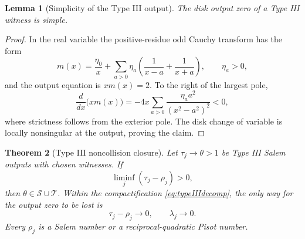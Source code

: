 \documentclass[11pt,reqno]{amsart}
\newtheorem{theorem}{Theorem}[section]
\newtheorem{lemma}[theorem]{Lemma}
\theoremstyle{definition}
\theoremstyle{remark}
\newcommand{\calS}{\mathcal S}
\newcommand{\calT}{\mathcal T}
\begin{document}
\begin{lemma}[Simplicity of the Type III output]\label{lem:IIIsimple}
The disk output zero of a Type III witness is simple.
\end{lemma}

\begin{proof}
In the real variable the positive-residue odd Cauchy transform has the form
\[
 m(x)=\frac{\eta_0}{x}+
 \sum_{a>0}\eta_a\left(\frac1{x-a}+\frac1{x+a}\right),
 \qquad \eta_a>0,
\]
and the output equation is $xm(x)=2$.  To the right of the largest pole,
\[
 \frac d{dx}\bigl(xm(x)\bigr)
 =-4x\sum_{a>0}\frac{\eta_a a^2}{(x^2-a^2)^2}<0,
\]
where strictness follows from the exterior pole.  The disk change of variable
is locally nonsingular at the output, proving the claim.
\end{proof}

\begin{theorem}[Type III noncollision closure]\label{thm:typeIII}
Let $\tau_j\to\theta>1$ be Type III Salem outputs with chosen witnesses.
If
\begin{equation}\label{eq:typeIIIseparation}
 \liminf_j(\tau_j-\rho_j)>0,
\end{equation}
then $\theta\in\calS\cup\calT$.  Within the compactification
\eqref{eq:typeIIIdecomp}, the only way for the output zero to be lost is
\begin{equation}\label{eq:typeIIIcollision}
 \tau_j-\rho_j\longrightarrow0,\qquad
 \lambda_j\longrightarrow0.
\end{equation}
Every $\rho_j$ is a Salem number or a reciprocal-quadratic Pisot number.
\end{theorem}
\end{document}
